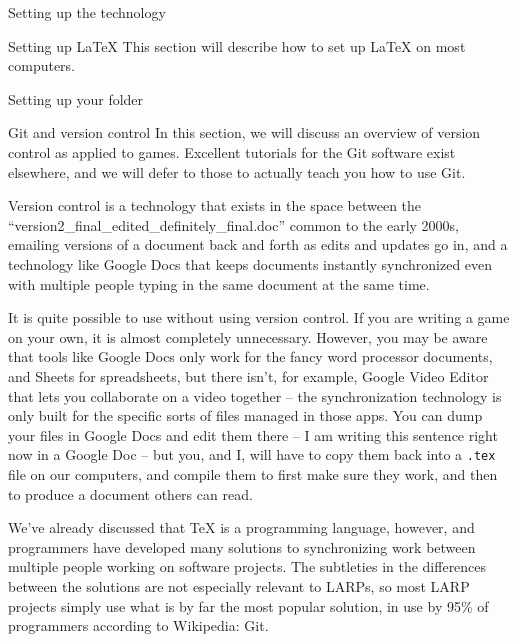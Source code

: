 \documentclass{article}
\begin{document}
\begin{section}{Setting up the technology}
\begin{subsection}{Setting up \LaTeX{}}
This section will describe how to set up \LaTeX{} on most computers.
\end{subsection}
\begin{subsection}{Setting up your \gametex{} folder}
\end{subsection}
\begin{subsection}{Git and version control}
In this section, we will discuss an overview of version control as applied to games.  Excellent tutorials for the Git software exist elsewhere, and we will defer to those to actually teach you how to use Git.

Version control is a technology that exists in the space between the ``version2\_final\_edited\_definitely\_final.doc'' common to the early 2000s, emailing versions of a document back and forth as edits and updates go in, and a technology like Google Docs that keeps documents instantly synchronized even with multiple people typing in the same document at the same time.

It is quite possible to use \gametex{} without using version control.  If you are writing a game on your own, it is almost completely unnecessary.  However, you may be aware that tools like Google Docs only work for the fancy word processor documents, and Sheets for spreadsheets, but there isn't, for example, Google Video Editor that lets you collaborate on a video together – the synchronization technology is only built for the specific sorts of files managed in those apps.  You can dump your \gametex{} files in Google Docs and edit them there – I am writing this sentence right now in a Google Doc – but you, and I, will have to copy them back into a \texttt{.tex} file on our computers, and compile them to first make sure they work, and then to produce a document others can read.

We've already discussed that \TeX{} is a programming language, however, and programmers have developed many solutions to synchronizing work between multiple people working on software projects.  The subtleties in the differences between the solutions are not especially relevant to LARPs, so most LARP projects simply use what is by far the most popular solution, in use by 95\% of programmers according to Wikipedia: Git.


\end{subsection}
\end{section}
\end{document}
